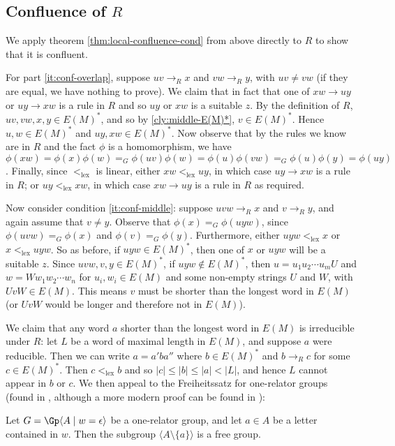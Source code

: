 \documentclass[libertine,widepage,nosubthm]{lmaths}
\newcommand{\ltlex}{<_{\mathrm{lex}}}
\begin{document}
\subsection{Confluence of $R$}

We apply theorem \ref{thm:local-confluence-cond} from above directly to $R$ to show that it is confluent.

For part \ref{it:conf-overlap}, suppose $uv \to_R x$ and $vw \to_R y$, with $uv \ne vw$ (if they are equal, we have nothing to prove). We claim that in fact that one of $xw \to uy$ or $uy \to xw$ is a rule in $R$ and so $uy$ or $xw$ is a suitable $z$. By the definition of $R$, $uv, vw, x, y\in E(M)^*$, and so by \cref{cly:middle-E(M)*}, $v \in E(M)^*$. Hence $u, w \in E(M)^*$ and $uy, xw \in E(M)^*$. Now observe that by the rules we know are in $R$ and the fact $\phi$ is a homomorphism, we have $\phi(xw) = \phi(x)\phi(w) =_G \phi(uv)\phi(w) = \phi(u)\phi(vw) =_G \phi(u)\phi(y) = \phi(uy)$. Finally, since $\ltlex$ is linear, either $xw \ltlex uy$, in which case $uy \to xw$ is a rule in $R$; or $uy \ltlex xw$, in which case $xw \to uy$ is a rule in $R$ as required.

Now consider condition \ref{it:conf-middle}: suppose $uvw \to_R x$ and $v \to_R y$, and again assume that $v \ne y$. Observe that $\phi(x) =_G \phi(uyw)$, since $\phi(uvw) =_G \phi(x)$ and $\phi(v) =_G \phi(y)$. Furthermore, either $uyw \ltlex x$ or $x \ltlex uyw$. So as before, if $uyw \in E(M)^*$, then one of $x$ or $uyw$ will be a suitable $z$. Since $uvw, v, y \in E(M)^*$, if $uyw \not\in E(M)^*$, then $u = u_1u_2 \cdots u_m U$ and $w = W w_1 w_2 \cdots w_n$ for $u_i, w_i \in E(M)$ and some non-empty strings $U$ and $W$, with $UvW \in E(M)$. This means $v$ must be shorter than the longest word in $E(M)$ (or $UvW$ would be longer and therefore not in $E(M)$).

We claim that any word $a$ shorter than the longest word in $E(M)$ is irreducible under $R$: let $L$ be a word of maximal length in $E(M)$, and suppose $a$ were reducible. Then we can write $a = a'ba''$ where $b \in E(M)^*$ and $b \to_R c$ for some $c \in E(M)^*$. Then $c \ltlex b$ and so $|c| \le |b| \le |a| < |L|$, and hence $L$ cannot appear in $b$ or $c$. We then appeal to the Freiheitssatz for one-relator groups (found in \cite{Magnus2004}, although a more modern proof can be found in \cite{Lyndon2001}):

\begin{theorem}[Freiheitssatz]
	Let $G = \Gp \langle A \mid w = \epsilon \rangle$ be a one-relator group, and let $a \in A$ be a letter contained in $w$. Then the subgroup $\langle A \setminus \{a\} \rangle$ is a free group.
\end{theorem}
\end{document}

